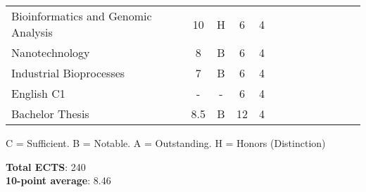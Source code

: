 \documentclass[12pt, oneside]{memoir}
\newcommand{\myrowcolour}{\rowcolor[gray]{0.925}}
\begin{document}
\begin{footnotesize}
\begin{longtable}{@{}l cc cc cc cc cc cc}
    \myrowcolour
    Bioinformatics and Genomic Analysis     & 10 & H & 6 & 4 \\
    Nanotechnology                          & 8 & B & 6 & 4 \\
    
    \myrowcolour
    Industrial Bioprocesses                 & 7 & B & 6 & 4 \\
    English C1                              & - & - & 6 & 4 \\
    
    \myrowcolour      
    Bachelor Thesis                         & 8.5& B & 12 & 4 \\   
               
\bottomrule
\end{longtable}
\end{footnotesize}
C = Sufficient. B = Notable. A = Outstanding. H = Honors (Distinction)

\vspace{1cm}

\textbf{Total ECTS}: 240 \\
\textbf{10-point average}: 8.46
\end{document}
